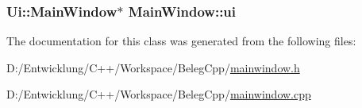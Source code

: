 \hypertarget{class_main_window_a35466a70ed47252a0191168126a352a5}{
\subsubsection[{ui}]{\setlength{\rightskip}{0pt plus 5cm}Ui\+::\+Main\+Window$\ast$ Main\+Window\+::ui\hspace{0.3cm}{\ttfamily [private]}}}\label{class_main_window_a35466a70ed47252a0191168126a352a5}


The documentation for this class was generated from the following files\+:\begin{DoxyCompactItemize}
\item 
D\+:/\+Entwicklung/\+C++/\+Workspace/\+Beleg\+Cpp/\hyperlink{mainwindow_8h}{mainwindow.\+h}\item 
D\+:/\+Entwicklung/\+C++/\+Workspace/\+Beleg\+Cpp/\hyperlink{mainwindow_8cpp}{mainwindow.\+cpp}\end{DoxyCompactItemize}
